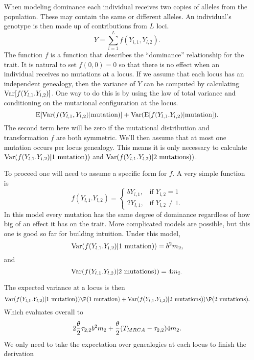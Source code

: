 When modeling dominance each individual receives two copies of alleles from the
population. These may contain the same or different alleles. An individual's
genotype is then made up of contributions from $L$ loci.
\begin{equation}
  Y=\sum_{l=1}^L f(Y_{l,1},Y_{l,2}).
\end{equation}
The function $f$ is a function that describes the ``dominance'' relationship for
the trait. It is natural to set $f(0,0)=0$ so that there is no effect when an
individual receives no mutations at a locus. If we assume that each locus has an
independent genealogy, then the variance of $Y$ can be computed by calculating
$\mathrm{Var}[f(Y_{l,1}.Y_{l,2})]$. One way to do this is by using the law of total
variance and conditioning on the mutational configuration at the locus.
\begin{equation*}
  \mathrm{E}[ \mathrm{Var}(f(Y_{l,1},Y_{l,2}) | \mbox{mutation} )] +
  \mathrm{Var}( \mathrm{E}[ f(Y_{l,1}.Y_{l,2}) | \mbox{mutation} ]).
\end{equation*}
The second term here will be zero if the mutational distribution and
transformation $f$ are both symmetric. We'll then assume that at most one
mutation occurs per locus genealogy. This means it is only necessary to
calculate $\mathrm{Var}(f(Y_{l,1}.Y_{l,2})| 1 \mbox{ mutation}))$ and
$\mathrm{Var}(f(Y_{l,1}.Y_{l,2})| 2 \mbox{ mutations}))$.

To proceed one will need to assume a specific form for $f$. A very simple
function is
\begin{equation}
  f(Y_{l,1}.Y_{l,2}) =
  \begin{cases}
    bY_{l,1}, & \text{if } Y_{l,2} = 1\\
    2Y_{l,1}, & \text{if } Y_{l,2} \neq 1.
  \end{cases}
\end{equation}
In this model every mutation has the same degree of dominance regardless of how
big of an effect it has on the trait. More complicated models are possible, but
this one is good so far for building intuition. Under this model,
\begin{equation*}
  \mathrm{Var}(f(Y_{l,1}.Y_{l,2})| 1 \mbox{ mutation})) = b^2m_2,
\end{equation*}
and
\begin{equation*}
  \mathrm{Var}(f(Y_{l,1}.Y_{l,2})| 2 \mbox{ mutations})) = 4m_2.
\end{equation*}

The expected variance at a locus is then
\begin{equation*}
  \Var(f(Y_{l,1}.Y_{l,2})| 1 \mbox{ mutation}))\P(1 \mbox{ mutation}) +
  \Var(f(Y_{l,1}.Y_{l,2})| 2 \mbox{ mutations}))\P(2 \mbox{ mutations}).
\end{equation*}
Which evaluates overall to
\begin{equation}
  2\frac{\theta}{2} \tau_{2,2} b^2 m_2 + \frac{\theta}{2}(T_{MRCA} - \tau_{2,2})4m_2.
\end{equation}
We only need to take the expectation over genealogies at each locus to finish
the derivation
